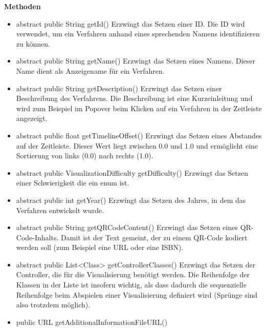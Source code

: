 \documentclass{article}
\begin{document}
      \textbf{Methoden}
      \begin{itemize}
        \item abstract public String getId() \newline
          Erzwingt das Setzen einer ID. Die ID wird verwendet, um ein Verfahren anhand
          eines sprechenden Namens identifizieren zu können.
        \item abstract public String getName() \newline
          Erzwingt das Setzen eines Namens. Dieser Name dient als Anzeigename für ein
          Verfahren.
        \item abstract public String getDescription() \newline
          Erzwingt das Setzen einer Beschreibung des Verfahrens. Die Beschreibung ist
          eine Kurzeinleitung und wird zum Beispiel im Popover beim Klicken auf ein
          Verfahren in der Zeitleiste angezeigt.
        \item abstract public float getTimelineOffset() \newline
          Erzwingt das Setzen eines Abstandes auf der Zeitleiste. Dieser Wert liegt
          zwischen 0.0 und 1.0 und ermöglicht eine Sortierung von links (0.0) nach rechts (1.0).
        \item abstract public VisualizationDifficulty getDifficulty() \newline
          Erzwingt das Setzen einer Schwierigkeit die ein enum ist.
        \item abstract public int getYear() \newline
          Erzwingt das Setzen des Jahres, in dem das Verfahren entwickelt wurde.
        \item abstract public String getQRCodeContent() \newline
          Erzwingt das Setzen eines QR-Code-Inhalts. Damit ist der Text gemeint, der
          zu einem QR-Code kodiert werden soll (zum Beispiel eine URL oder eine ISBN).
        \item abstract public List<Class> getControllerClasses() \newline
          Erzwingt das Setzen der Controller, die für die Visualisierung benötigt werden.
          Die Reihenfolge der Klassen in der Liste ist insofern wichtig, als dass dadurch
		  die sequenzielle Reihenfolge beim Abspielen einer Visualisierung definiert wird 
		  (Sprünge sind also trotzdem möglich).
        \item public URL getAdditionalInformationFileURL() \newline

\end{itemize}
\end{document}
